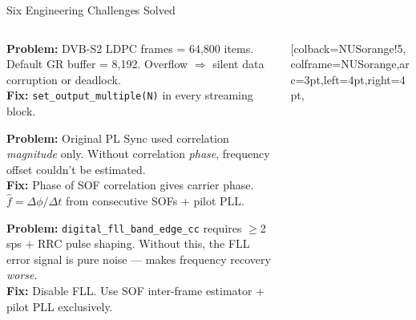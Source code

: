 \documentclass[aspectratio=169,10pt]{beamer}
\begin{document}
\begin{frame}[shrink=22]{Six Engineering Challenges Solved}
  \begin{columns}[T]
    \begin{column}{0.50\textwidth}
      \begin{tcolorbox}[colback=NUSred!5,colframe=NUSred,arc=3pt,left=4pt,right=4pt,
                        title={\scriptsize\bfseries [Bug 1] Frame size mismatch},
                        fonttitle=\bfseries\scriptsize,top=2pt,bottom=2pt]
        \scriptsize \textbf{Problem:} DVB-S2 LDPC frames = 64,800 items. Default GR buffer = 8,192.
        Overflow $\Rightarrow$ silent data corruption or deadlock.\\
        \textbf{Fix:} \texttt{set\_output\_multiple(N)} in every streaming block.
      \end{tcolorbox}
      \vspace{0.2em}
      \begin{tcolorbox}[colback=NUSred!5,colframe=NUSred,arc=3pt,left=4pt,right=4pt,
                        title={\scriptsize\bfseries [Bug 2] Spinning constellation (Doppler)},
                        fonttitle=\bfseries\scriptsize,top=2pt,bottom=2pt]
        \scriptsize \textbf{Problem:} Original PL Sync used correlation \emph{magnitude} only.
        Without correlation \emph{phase}, frequency offset couldn't be estimated.\\
        \textbf{Fix:} Phase of SOF correlation gives carrier phase.
        $\hat{f} = \Delta\phi/\Delta t$ from consecutive SOFs + pilot PLL.
      \end{tcolorbox}
      \vspace{0.2em}
      \begin{tcolorbox}[colback=NUSred!5,colframe=NUSred,arc=3pt,left=4pt,right=4pt,
                        title={\scriptsize\bfseries [Bug 3] FLL band-edge at 1 sps},
                        fonttitle=\bfseries\scriptsize,top=2pt,bottom=2pt]
        \scriptsize \textbf{Problem:} \texttt{digital\_fll\_band\_edge\_cc} requires $\geq$2 sps
        + RRC pulse shaping. Without this, the FLL error signal is pure noise — makes
        frequency recovery \emph{worse}.\\
        \textbf{Fix:} Disable FLL. Use SOF inter-frame estimator + pilot PLL exclusively.
      \end{tcolorbox}
    \end{column}
    \begin{column}{0.46\textwidth}
      \begin{tcolorbox}[colback=NUSorange!5,colframe=NUSorange,arc=3pt,left=4pt,right=4pt,

\end{tcolorbox}
\end{column}
\end{columns}
\end{frame}
\end{document}
